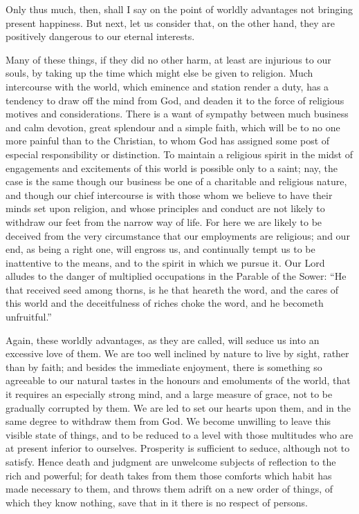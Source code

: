 Only thus much, then, shall I say on the point of worldly
advantages not bringing present happiness. But next, let us consider
that, on the other hand, they are positively dangerous to our eternal
interests.

Many of these things, if they did no other harm, at least are
injurious to our souls, by taking up the time which might else be
given to religion. Much intercourse with the world, which eminence and
station render a duty, has a tendency to draw off the mind from God,
and deaden it to the force of religious motives and considerations.
There is a want of sympathy between much business and calm devotion,
great splendour and a simple faith, which will be to no one more
painful than to the Christian, to whom God has assigned some post of
especial responsibility or distinction. To maintain a religious spirit
in the midst of engagements and excitements of this world is possible
only to a saint; nay, the case is the same though our business be one
of a charitable and religious nature, and though our chief intercourse
is with those whom we believe to have their minds set upon religion,
and whose principles and conduct are not likely to withdraw our feet
from the narrow way of life. For here we are likely to be deceived
from the very circumstance that our employments are religious; and our
end, as being a right one, will engross us, and continually tempt us
to be inattentive to the means, and to the spirit in which we pursue
it. Our Lord alludes to the danger of multiplied occupations in the
Parable of the Sower: ``He that received seed among thorns, is he
that heareth the word, and the cares of this world and the
deceitfulness of riches choke the word, and he becometh
unfruitful.''

Again, these worldly advantages, as they are called, will seduce us
into an excessive love of them. We are too well inclined by nature to
live by sight, rather than by faith; and besides the immediate
enjoyment, there is something so agreeable to our natural tastes in
the honours and emoluments of the world, that it requires an
especially strong mind, and a large measure of grace, not to be
gradually corrupted by them. We are led to set our hearts upon them,
and in the same degree to withdraw them from God. We become unwilling
to leave this visible state of things, and to be reduced to a level
with those multitudes who are at present inferior to ourselves.
Prosperity is sufficient to seduce, although not to satisfy. Hence
death and judgment are unwelcome subjects of reflection to the rich
and powerful; for death takes from them those comforts which habit has
made necessary to them, and throws them adrift on a new order of
things, of which they know nothing, save that in it there is no
respect of persons.

